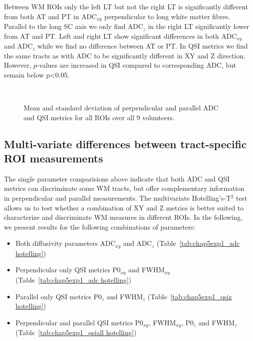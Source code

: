Between \gls{WM} \glspl{ROI} only the left LT but not the right LT is significantly different from both AT and PT in ADC$_{xy}$ perpendicular to long white matter fibres. Parallel to the long \gls{SC} axis we only find ADC$_{z}$ in the right LT significantly lower from AT and PT. Left and right LT show significant differences in both ADC$_{xy}$ and ADC$_{z}$ while we find no difference between AT or PT. In \gls{QSI} metrics we find the same tracts as with ADC to be significantly different in XY and Z direction. However, $p$-values are increased in \gls{QSI} compared to corresponding ADC, but remain below p<0.05.%
\begin{figure}[h!tp]
	\\
   \caption{Mean and standard deviation of perpendicular and parallel ADC and QSI metrics for all ROIs over all 9 volunteers.}
   \label{fig:chapter5 exp1 vals}	
\end{figure}

\subsection{Multi-variate differences between tract-specific ROI measurements}
The single parameter comparisions above indicate that both \gls{ADC} and \gls{QSI} metrics can discriminate some WM tracts, but offer complementary information in perpendicular and parallel measurements. The multivariate Hotelling's-T$^2$ test allows us to test whether a combination of XY and Z metrics is better suited to characterize and discriminate \gls{WM} measures in different \glspl{ROI}. In the following, we present results for the following combinations of parameters:
\begin{itemize}
    \item Both diffusivity parameters ADC$_{xy}$ and ADC$_z$ (Table~\ref{tab:chap5exp1_adc hotelling})
    \item Perpendicular only \gls{QSI} metrics P0$_{xy}$ and FWHM$_{xy}$ (Table~\ref{tab:chap5exp1_adc hotelling})
    \item Parallel only \gls{QSI} metrics P0$_z$ and FWHM$_z$ (Table~\ref{tab:chap5exp1_qsiz hotelling})
    \item Perpendicular and parallel \gls{QSI} metrics P0$_{xy}$, FWHM$_{xy}$, P0$_z$ and FWHM$_z$ (Table~\ref{tab:chap5exp1_qsiall hotelling})
\end{itemize}



